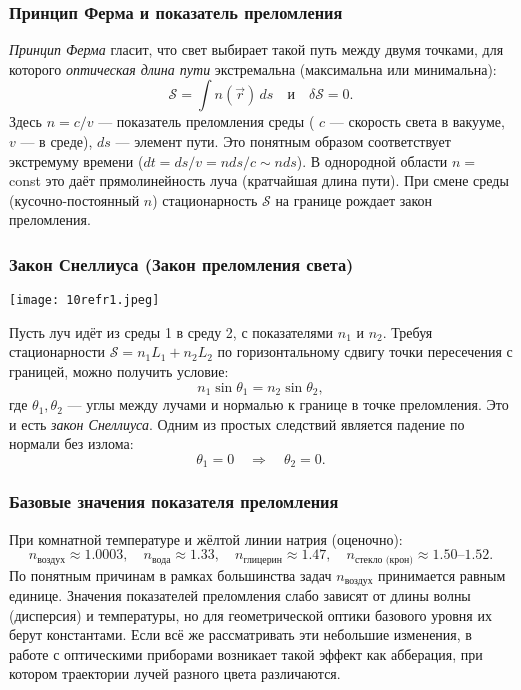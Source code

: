 \documentclass[12pt, a4paper]{article}%
\begin{document}
\subsubsection*{Принцип Ферма и показатель преломления}
\textit{Принцип Ферма} гласит, что свет выбирает такой путь между двумя точками, для которого \emph{оптическая длина пути} экстремальна (максимальна или минимальна):
\[
\mathcal S=\int n(\vec r)\,ds \quad \text{и} \quad \delta\mathcal S=0.
\]
Здесь \(n=c/v\) — показатель преломления среды ( \(c\) — скорость света в вакууме, \(v\) — в среде), \(ds\) — элемент пути. Это понятным образом соответствует экстремуму времени ($dt = ds/v = nds/c\sim nds$).
В однородной области \(n=\) const это даёт прямолинейность луча (кратчайшая длина пути). При смене среды (кусочно-постоянный \(n\)) стационарность \(\mathcal S\) на границе рождает закон преломления.

\subsubsection*{Закон Снеллиуса (Закон преломления света)}

\begin{center}
\texttt{[image: 10refr1.jpeg]}
\label{fig:mpr}
\end{center}

Пусть луч идёт из среды 1 в среду 2, с показателями \(n_1\) и \(n_2\). Требуя стационарности \(\mathcal S=n_1 L_1+n_2 L_2\) по горизонтальному сдвигу точки пересечения с границей, можно получить условие:
\[
n_1\sin\theta_1 = n_2\sin\theta_2,
\]
где \(\theta_1,\theta_2\) — углы между лучами и нормалью к границе в точке преломления. Это и есть \textit{закон Снеллиуса}. Одним из простых следствий является падение по нормали без излома:
\[
\theta_1=0 \quad\Longrightarrow\quad \theta_2=0.
\]

\subsubsection*{Базовые значения показателя преломления}
При комнатной температуре и жёлтой линии натрия (оценочно):
\[
n_{\text{воздух}}\approx1.0003,\quad
n_{\text{вода}}\approx1.33,\quad
n_{\text{глицерин}}\approx1.47,\quad
n_{\text{стекло (крон)}}\approx1.50\text{–}1.52.
\]
По понятным причинам в рамках большинства задач $n_{\text{воздух}}$ принимается равным единице. Значения показателей преломления слабо зависят от длины волны (дисперсия) и температуры, но для геометрической оптики базового уровня их берут константами. Если всё же рассматривать эти небольшие изменения, в работе с оптическими приборами возникает такой эффект как абберация, при котором траектории лучей разного цвета различаются.
\end{document}
